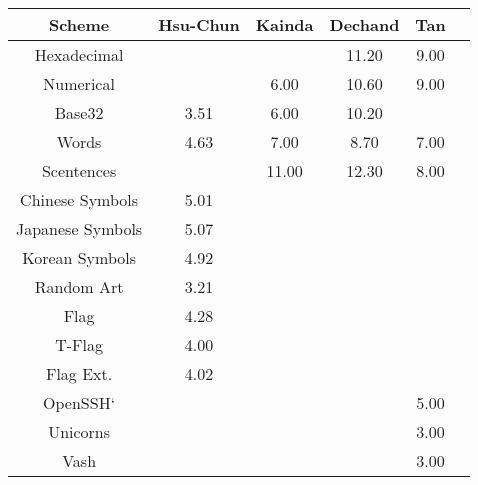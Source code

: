 \begin{tabular}{c|ccccc}
    \toprule
    \textbf{Scheme} 
    & Hsu-Chun\cite{hsiao2009study}      
    & Kainda\cite{kainda2009usability}      
    & Dechand\cite{dechand2016empirical}
    & Tan\cite{tan2017can}      
    \\\hline
    Hexadecimal     &           &           & 11.20   & 9.00\\
    Numerical       &           & 6.00      & 10.60   & 9.00\\
    Base32          & 3.51      & 6.00      & 10.20   & \\
    Words           & 4.63      & 7.00      & 8.70    & 7.00 \\
    Scentences      &           & 11.00     & 12.30   & 8.00 \\
    Chinese Symbols & 5.01   &           &         & \\
    Japanese Symbols& 5.07   &           &         & \\
    Korean Symbols  & 4.92   &           &         & \\
    \midrule
    Random Art	     & 3.21   &&&&\\
    Flag    	     & 4.28   &&&&\\
    T-Flag  	     & 4.00   &&&&\\
    Flag Ext.	     & 4.02   &&&&\\
    OpenSSH`         &&&& 5.00 &\\
    Unicorns         &&&& 3.00 &\\
    Vash             &&&& 3.00 &\\
    \bottomrule
\end{tabular}